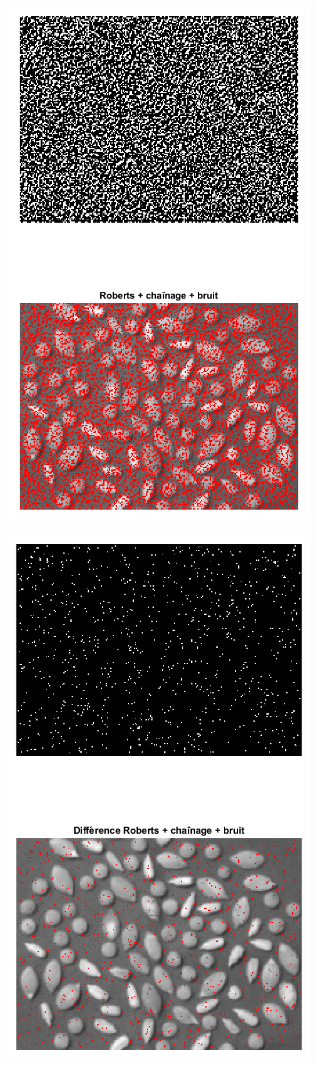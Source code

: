 \documentclass{article}
\begin{document}
\begin{itemize}[leftmargin=*]
\begin{itemize}[leftmargin=*]
\begin{minipage}[c]{0.46\linewidth}
\end{minipage}\hfill

\begin{minipage}[c]{0.46\linewidth}		
	\includegraphics[width=8cm]{Roberts_link_noise5.png}
\end{minipage}\hfill
\begin{minipage}[c]{0.46\linewidth}
	\includegraphics[width=8cm]{Diff_Roberts_link_noise5.png}
\end{minipage}\hfill


\end{itemize}
\end{itemize}
\end{document}
